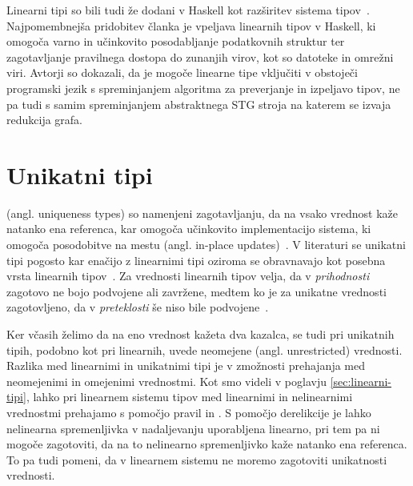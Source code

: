Linearni tipi so bili tudi že dodani v Haskell kot razširitev sistema tipov~\cite{bernardy2018linear}. Najpomembnejša pridobitev članka je vpeljava linearnih tipov v Haskell, ki omogoča varno in učinkovito posodabljanje podatkovnih struktur ter zagotavljanje pravilnega dostopa do zunanjih virov, kot so datoteke in omrežni viri. Avtorji so dokazali, da je mogoče linearne tipe vključiti v obstoječi programski jezik s spreminjanjem algoritma za preverjanje in izpeljavo tipov, ne pa tudi s samim spreminjanjem abstraktnega STG stroja na katerem se izvaja redukcija grafa.

\section{Unikatni tipi}
\label{sec:unikatni-tipi}


 (angl. uniqueness types) so namenjeni zagotavljanju, da na vsako vrednost kaže natanko ena referenca, kar omogoča učinkovito implementacijo sistema, ki omogoča posodobitve na mestu (angl. in-place updates)~\cite{marshall2022linearity}. V literaturi se unikatni tipi pogosto kar enačijo z linearnimi tipi oziroma se obravnavajo kot posebna vrsta linearnih tipov~\cite{pierce2004advanced, bernardy2018linear}. Za vrednosti linearnih tipov velja, da v \textit{prihodnosti} zagotovo ne bojo podvojene ali zavržene, medtem ko je za unikatne vrednosti zagotovljeno, da v \textit{preteklosti} še niso bile podvojene~\cite{marshall2022linearity, marshall2024functional}.

Ker včasih želimo da na eno vrednost kažeta dva kazalca, se tudi pri unikatnih tipih, podobno kot pri linearnih, uvede neomejene (angl. unrestricted) vrednosti. Razlika med linearnimi in unikatnimi tipi je v zmožnosti prehajanja med neomejenimi in omejenimi vrednostmi. Kot smo videli v poglavju \ref{sec:linearni-tipi}, lahko pri linearnem sistemu tipov med linearnimi in nelinearnimi vrednostmi prehajamo s pomočjo pravil  in . S pomočjo derelikcije je lahko nelinearna spremenljivka v nadaljevanju uporabljena linearno, pri tem pa ni mogoče zagotoviti, da na to nelinearno spremenljivko kaže natanko ena referenca. To pa tudi pomeni, da v linearnem sistemu ne moremo zagotoviti unikatnosti vrednosti.

